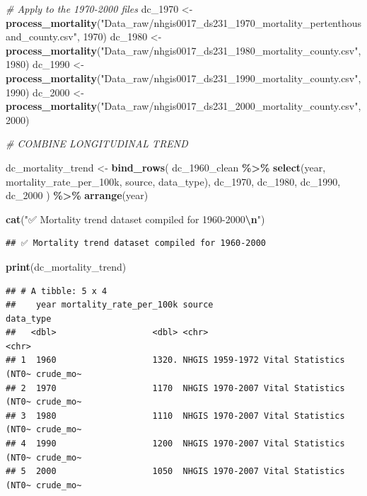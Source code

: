 \documentclass[
]{article}
\newenvironment{Shaded}{\begin{snugshade}}{\end{snugshade}}
\newcommand{\CommentTok}[1]{\textcolor[rgb]{0.56,0.35,0.01}{\textit{#1}}}
\newcommand{\DecValTok}[1]{\textcolor[rgb]{0.00,0.00,0.81}{#1}}
\newcommand{\FunctionTok}[1]{\textcolor[rgb]{0.13,0.29,0.53}{\textbf{#1}}}
\newcommand{\NormalTok}[1]{#1}
\newcommand{\OtherTok}[1]{\textcolor[rgb]{0.56,0.35,0.01}{#1}}
\newcommand{\SpecialCharTok}[1]{\textcolor[rgb]{0.81,0.36,0.00}{\textbf{#1}}}
\newcommand{\StringTok}[1]{\textcolor[rgb]{0.31,0.60,0.02}{#1}}
\begin{document}
\begin{Shaded}
\begin{Highlighting}[]
\CommentTok{\# Apply to the 1970{-}2000 files}
\NormalTok{dc\_1970 }\OtherTok{\textless{}{-}} \FunctionTok{process\_mortality}\NormalTok{(}\StringTok{"Data\_raw/nhgis0017\_ds231\_1970\_mortality\_pertenthousand\_county.csv"}\NormalTok{, }\DecValTok{1970}\NormalTok{)}
\NormalTok{dc\_1980 }\OtherTok{\textless{}{-}} \FunctionTok{process\_mortality}\NormalTok{(}\StringTok{"Data\_raw/nhgis0017\_ds231\_1980\_mortality\_county.csv"}\NormalTok{, }\DecValTok{1980}\NormalTok{)}
\NormalTok{dc\_1990 }\OtherTok{\textless{}{-}} \FunctionTok{process\_mortality}\NormalTok{(}\StringTok{"Data\_raw/nhgis0017\_ds231\_1990\_mortality\_county.csv"}\NormalTok{, }\DecValTok{1990}\NormalTok{)}
\NormalTok{dc\_2000 }\OtherTok{\textless{}{-}} \FunctionTok{process\_mortality}\NormalTok{(}\StringTok{"Data\_raw/nhgis0017\_ds231\_2000\_mortality\_county.csv"}\NormalTok{, }\DecValTok{2000}\NormalTok{)}


\CommentTok{\#  COMBINE LONGITUDINAL TREND}

\NormalTok{dc\_mortality\_trend }\OtherTok{\textless{}{-}} \FunctionTok{bind\_rows}\NormalTok{(}
\NormalTok{  dc\_1960\_clean }\SpecialCharTok{\%\textgreater{}\%} \FunctionTok{select}\NormalTok{(year, mortality\_rate\_per\_100k, source, data\_type),}
\NormalTok{  dc\_1970,}
\NormalTok{  dc\_1980,}
\NormalTok{  dc\_1990,}
\NormalTok{  dc\_2000}
\NormalTok{) }\SpecialCharTok{\%\textgreater{}\%}
  \FunctionTok{arrange}\NormalTok{(year)}

\FunctionTok{cat}\NormalTok{(}\StringTok{"✅ Mortality trend dataset compiled for 1960{-}2000}\SpecialCharTok{\textbackslash{}n}\StringTok{"}\NormalTok{)}
\end{Highlighting}
\end{Shaded}

\begin{verbatim}
## ✅ Mortality trend dataset compiled for 1960-2000
\end{verbatim}

\begin{Shaded}
\begin{Highlighting}[]
\FunctionTok{print}\NormalTok{(dc\_mortality\_trend)}
\end{Highlighting}
\end{Shaded}

\begin{verbatim}
## # A tibble: 5 x 4
##    year mortality_rate_per_100k source                                 data_type
##   <dbl>                   <dbl> <chr>                                  <chr>    
## 1  1960                   1320. NHGIS 1959-1972 Vital Statistics (NT0~ crude_mo~
## 2  1970                   1170  NHGIS 1970-2007 Vital Statistics (NT0~ crude_mo~
## 3  1980                   1110  NHGIS 1970-2007 Vital Statistics (NT0~ crude_mo~
## 4  1990                   1200  NHGIS 1970-2007 Vital Statistics (NT0~ crude_mo~
## 5  2000                   1050  NHGIS 1970-2007 Vital Statistics (NT0~ crude_mo~
\end{verbatim}
\end{document}

